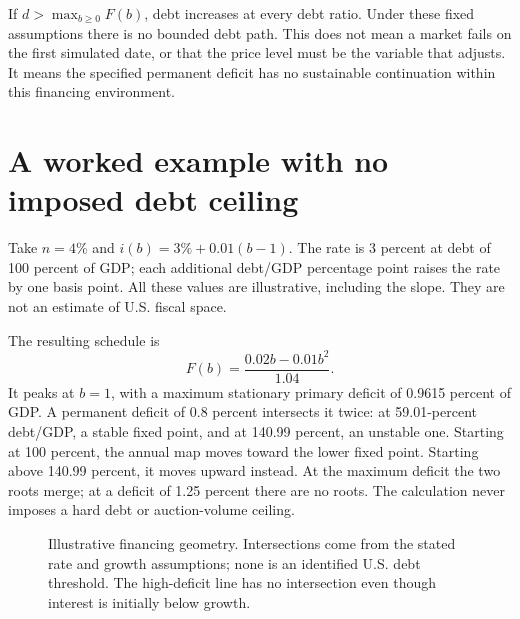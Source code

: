 \documentclass[11pt]{article}
\begin{document}
If $d>\max_{b\geq0}F(b)$, debt increases at every debt ratio. Under these fixed assumptions
there is no bounded debt path. This does not mean a market fails on the first simulated
date, or that the price level must be the variable that adjusts. It means the specified
permanent deficit has no sustainable continuation within this financing environment.

\section{A worked example with no imposed debt ceiling}

Take $n=4\%$ and $i(b)=3\%+0.01(b-1)$. The rate is 3 percent at debt of 100 percent of GDP;
each additional debt/GDP percentage point raises the rate by one basis point. All these
values are illustrative, including the slope. They are not an estimate of U.S. fiscal space.

The resulting schedule is
\[
F(b)=\frac{0.02b-0.01b^2}{1.04}.
\]
It peaks at $b=1$, with a maximum stationary primary deficit of 0.9615 percent of GDP.
A permanent deficit of 0.8 percent intersects it twice: at 59.01-percent debt/GDP, a stable
fixed point, and at 140.99 percent, an unstable one. Starting at 100 percent, the annual
map moves toward the lower fixed point. Starting above 140.99 percent, it moves upward
instead. At the maximum deficit the two roots merge; at a deficit of 1.25 percent there
are no roots. The calculation never imposes a hard debt or auction-volume ceiling.

\begin{figure}[htbp]
\centering
{}
\caption{Illustrative financing geometry. Intersections come from the stated rate and
growth assumptions; none is an identified U.S. debt threshold. The high-deficit line has
no intersection even though interest is initially below growth.}
\end{figure}
\end{document}
